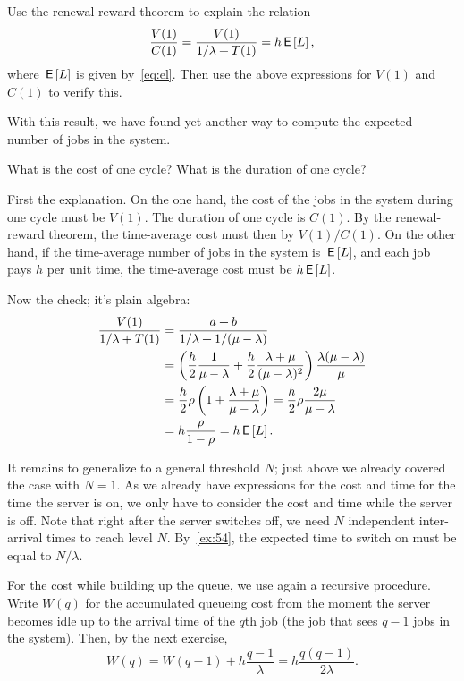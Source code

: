 \begin{exercise}
Use the renewal-reward theorem to explain the  relation
\begin{equation*}
  \frac{V(1)}{C(1)} = \frac{V(1)}{1/\lambda + T(1)} = h \,\mathsf{E}\left[L\right],
\end{equation*}
where $\,\mathsf{E}\left[L\right]$ is given by~\cref{eq:el}. Then use the above expressions for $V(1)$ and $C(1)$ to verify this.

With this result, we have found yet another way to compute the expected number of jobs in the system.  
\begin{hint}
  What is the cost of one cycle? What is the duration of one cycle? 
\end{hint}
\begin{solution}
  First the explanation.
  On the one hand, the cost of the jobs in the system during one cycle must be $V(1)$.
  The duration of one cycle is $C(1)$.
  By the renewal-reward theorem, the time-average cost must then by $V(1)/C(1)$.
  On the other hand, if the time-average number of jobs in the system is $\,\mathsf{E}\left[L\right]$, and each job pays $h$ per unit time, the time-average cost must be $h \,\mathsf{E}\left[L\right]$.

  Now the check; it's plain algebra:
\begin{align*}
  \frac{V(1)}{1/\lambda + T(1)}
  &= \frac{a+b}{1/\lambda + 1/(\mu-\lambda)} \\
  &= \left(\frac h 2 \frac 1 {\mu -\lambda} + \frac h 2 \frac{\lambda + \mu}{(\mu - \lambda)^2}\right)\frac{\lambda(\mu-\lambda)}{\mu}\\
&=\frac{h}2 \rho \left(1 + \frac{\lambda+\mu}{\mu-\lambda}\right) = \frac{h}{2} \rho \frac{2\mu}{\mu-\lambda}  \\
&= h \frac{\rho}{1-\rho} = h \,\mathsf{E}\left[L\right]. \\
\end{align*}
\end{solution}
\end{exercise}

It remains to generalize to a general threshold $N$; just above we already covered the case with $N=1$.
As we already have expressions for the cost and time for the time the server is on, we only have to consider the cost and time while the server is off.
Note that right after the server switches off, we need $N$ independent inter-arrival times to reach level $N$.
By~\cref{ex:54}, the expected time  to switch on must be equal to $N/\lambda$.

For the cost while building up the queue, we use again a recursive procedure.
Write $W(q)$ for the accumulated queueing cost from the moment the server becomes idle up to the arrival time of the $q$th job (the job that sees $q-1$ jobs in the system).
Then, by the next exercise,
\begin{equation}\label{eq:99}
  W(q) = W(q-1) + h\frac{q-1}{\lambda} = h \frac{q(q-1)}{2\lambda}.
\end{equation}

